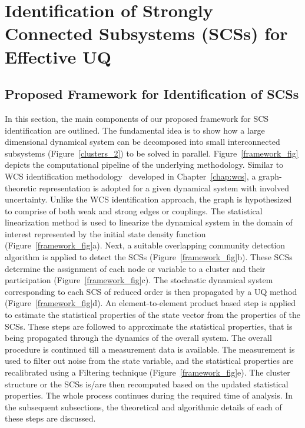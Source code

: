 \chapter{Identification of Strongly Connected Subsystems (SCSs) for Effective UQ}
\label{chap:scs}

\section{Proposed Framework for Identification of SCSs}
\label{scs_framework}

In this section, the main components of our proposed framework for SCS identification are outlined. The fundamental idea is to show how a large dimensional dynamical system can be decomposed into small interconnected subsystems (Figure~\ref{clusters_2}) to be solved in parallel. Figure~\ref{framework_fig} depicts the computational pipeline of the underlying methodology. Similar to WCS identification methodology~\cite{mukherjee2015laplacian,mukherjeecomparison} developed in Chapter~\ref{chap:wcs}, a graph-theoretic representation is adopted for a given dynamical system with involved uncertainty. Unlike the WCS identification approach, the graph is hypothesized to comprise of both weak and strong edges or couplings. The statistical linearization method is used to linearize the dynamical system in the domain of interest represented by the initial state density function (Figure~\ref{framework_fig}a). Next, a suitable overlapping community detection algorithm is applied to detect the SCSs (Figure~\ref{framework_fig}b). These SCSs determine the assignment of each node or variable to a cluster and their participation (Figure~\ref{framework_fig}c). The stochastic dynamical system corresponding to each SCS of reduced order is then propagated by a UQ method (Figure~\ref{framework_fig}d). An element-to-element product based step is applied to estimate the statistical properties of the state vector from the properties of the SCSs. These steps are followed to approximate the statistical properties, that is being propagated through the dynamics of the overall system. The overall procedure is continued till a measurement data is available. The measurement is used to filter out noise from the state variable, and the statistical properties are recalibrated using a Filtering technique (Figure~\ref{framework_fig}e). The cluster structure or the SCSs is/are then recomputed based on the updated statistical properties. The whole process continues during the required time of analysis. In the subsequent subsections, the theoretical and algorithmic details of each of these steps are discussed. 

